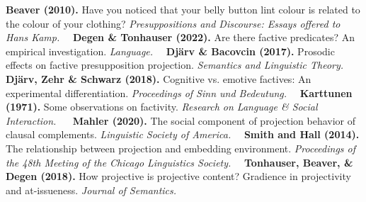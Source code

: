 \documentclass[12pt, a4paper]{article}
\begin{document}




\newpage
{\scriptsize
{}
%
{\bf Beaver (2010).} Have you noticed that your belly button lint colour is related to the colour of your clothing? {\em Presuppositions and Discourse: Essays offered to Hans Kamp.}~\textbullet~
{\bf Degen \& Tonhauser (2022).} Are there factive predicates? An empirical investigation. {\em Language.}~\textbullet~
{\bf Djärv \& Bacovcin (2017).} Prosodic effects on factive presupposition projection. {\em Semantics and Linguistic Theory.}~\textbullet~
{\bf Djärv, Zehr \& Schwarz (2018).} Cognitive vs. emotive factives: An experimental differentiation. {\em Proceedings of Sinn und Bedeutung.}~\textbullet~
{\bf Karttunen (1971).} Some observations on factivity. {\em Research on Language \& Social Interaction.} ~\textbullet~
{\bf Mahler (2020).} The social component of projection behavior of clausal complements. {\em Linguistic Society of America.}~\textbullet~
{\bf Smith and Hall (2014).} The relationship between projection and embedding environment. {\em Proceedings of the 48th Meeting of the Chicago Linguistics Society.}~\textbullet~
{\bf Tonhauser, Beaver, \& Degen (2018).} How projective is projective content? Gradience in projectivity and at-issueness. {\em Journal of Semantics.}~\textbullet~

}
\end{document}
